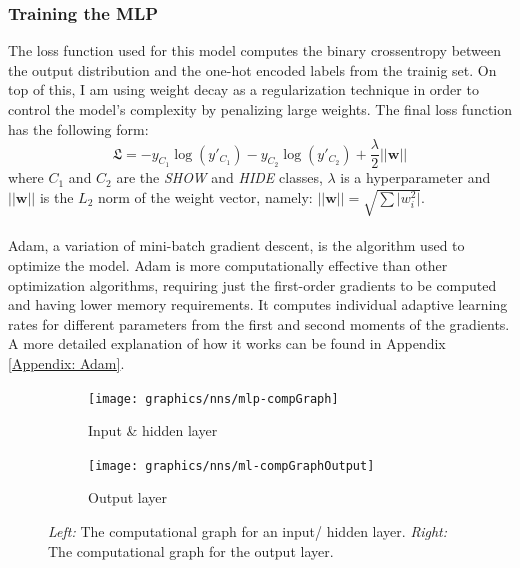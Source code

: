 	\subsubsection*{Training the MLP}
	The loss function used for this model computes the binary crossentropy between the output distribution and the one-hot encoded labels from the trainig set. On top of this, I am using weight decay as a regularization technique in order to control the model's complexity by penalizing large weights. The final loss function has the following form:
	\begin{equation}
		\mathfrak{L} = - y_{C_1}\log(y'_{C_1}) - y_{C_2}\log(y'_{C_2}) + \frac{\lambda}{2}\vert\vert\mathbf{w}\vert\vert 
		\label{Eq: impl/ml/loss}
	\end{equation}
	where $C_1$ and $C_2$ are the \textit{SHOW} and \textit{HIDE} classes, $\lambda$ is a hyperparameter and $\vert\vert\mathbf{w}\vert\vert$ is the $L_2$ norm of the weight vector, namely: $\vert\vert\mathbf{w}\vert\vert = \sqrt{\sum \vert w_i^2 \vert}$.
	\\ \\
	Adam\cite{DBLP:journals/corr/KingmaB14}, a variation of mini-batch gradient descent, is the algorithm used to optimize the model. Adam is more computationally effective than other optimization algorithms, requiring just the first-order gradients to be computed and having lower memory requirements. It computes individual adaptive learning rates for different parameters from the first and second moments of the gradients. A more detailed explanation of how it works can be found in Appendix \ref{Appendix: Adam}.

	\begin{figure}[H]
		\centering
		\begin{subfigure}[b]{.4\textwidth}
			\texttt{[image: graphics/nns/mlp-compGraph]}
			\caption{Input \& hidden layer}
			\label{Fig: impl/ml/mlp/compgraph-hidden}
		\end{subfigure}
		\hfill
		\begin{subfigure}[b]{.4\textwidth}
			\texttt{[image: graphics/nns/ml-compGraphOutput]}
			\caption{Output layer}
			\label{Fig: impl/ml/mlp/compgraph-output}
	\end{subfigure}
	\caption[Computational graphs for MLP layers]{\textit{Left:} The computational graph for an input/ hidden layer. \textit{Right:} The computational graph for the output layer.}
	\label{Fig: impl/ml/mlp/compgraph}
	\end{figure}
	
